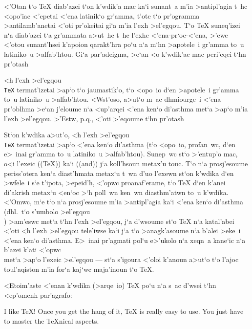 <'Otan  t`o {\rm \TeX} diab'azei t`on k'wdik'a mac ka`i sunant~a m'ia
>antipl'agia t~hc <opo'iac <'epetai <'ena latinik`o gr'amma, t'ote t`o  
pr'ogramma >antilamb'anetai <'oti pr'okeitai gi`a m'ia l'exh >el'egqou. 
T`o {\rm \TeX} suneq'izei n`a diab'azei t`a gr'ammata a>ut~hc t~hc      
l'exhc <'ena-pr`oc-<'ena, >'ewc <'otou sunant'hsei k'apoion qarakt'hra
po`u n`a m`hn >apotele~i gr'amma to~u latiniko~u >alfab'htou.  Gi`a     
par'adeigma, >e`an <o k'wdik'ac mac peri'eqei t`hn pr'otash


\noindent
<h l'exh >el'egqou {\tt \\TeX} termat'izetai >ap`o t`o jaumastik'o, t`o 
<opo~io d`en >apo\-tele~i gr'amma to~u latiniko~u >alfab'htou. <Wst'oso,
a>ut`o m~ac dhmiourge~i <'ena pr'oblhma >e`an j'eloume n`a <up'arqei     
<'ena ken`o di'asthma met`a >ap`o m'ia l'exh >el'egqou.  >'Estw, p.q.,
<'oti >'eqoume t`hn pr'otash


\noindent St`on k'wdika a>ut'o, <h l'exh >el'egqou {\tt\\TeX}
termat'izetai >ap`o <'ena ken`o di'asthma (t`o <opo~io, pro\-fa\-n~wc,
d`en e>~inai gr'amma to~u latiniko~u >alfab'htou).  Sunep~wc st`o
>'entup'o mac, o<i l'exeic (({\rm\TeX})) ka`i (({\rm and})) j`a
koll'hsoun metax'u touc.  T`o n`a prosj'esoume periss'otera ken`a
diast'hmata metax`u t~wn d'uo l'exewn st`on k'wdika d`en >wfele~i s`e
t'ipota, >epeid'h, <'opwc proanaf'erame, t`o {\rm \TeX} d`en k'anei
di'akrish metax`u <en`oc >`h poll~wn ken~wn diasthm'atwn to~u k'wdika. 
<'Omwc, m`e t`o n`a prosj'esoume m'ia >antipl'agia ka`i <'ena ken`o
di'asthma (dhl.\ t`o s'umbolo >el'egqou {\tt\\\sp}) >am'eswc met`a t`hn
l'exh >el'egqou, j`a d'wsoume st`o {\rm \TeX} n`a katal'abei <'oti <h
l'exh >el'egqou tele'iwse ka`i j`a t`o >anagk'asoume n`a b'alei >eke~i
<'ena ken`o di'asthma.  E>~inai pr'agmati pol`u e>'ukolo n`a xeqn~a
kane`ic n`a b'azei k'ati <'opwc {\tt\\\sp} met`a >ap`o l'exeic >el'egqou
--- st`a s'igoura <'oloi k'anoun a>ut`o t`o l'ajoc toul'aqiston m'ia
for`a kaj`wc maja'inoun t`o {\rm \TeX}\null.

\exercise <Etoim'aste <'enan k'wdika (>arqe~io) {\rm \TeX} po`u n`a s~ac
d'wsei t`hn <ep'omenh par'agrafo:

{\rm
I like \TeX! Once you get the hang of it, \TeX{} is really easy to use.
You just have to master the \TeX nical aspects.
}

